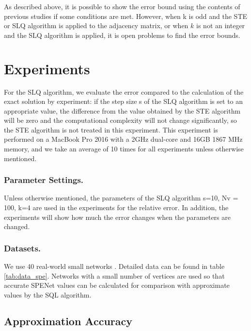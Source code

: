 \documentclass[senior,final,11pt]{iscs-thesis}
\begin{document}
As described above, it is possible to show the error bound using the contents of previous studies if some conditions are met. However, when k is odd and the STE or SLQ algorithm is applied to the adjacency matrix, or when $k$ is not an integer and the SLQ algorithm is applied, it is open problems to find the error bounds.

\section{Experiments}
For the SLQ algorithm, we evaluate the error compared to the calculation of the exact solution by experiment: if the step size s of the SLQ algorithm is set to an appropriate value, the difference from the value obtained by the STE algorithm will be zero and the computational complexity will not change significantly, so the STE algorithm is not treated in this experiment. This experiment is performed on a MacBook Pro 2016 with a 2GHz dual-core and 16GB 1867 MHz memory, and we take an average of 10 times for all experiments unless otherwise mentioned.

\subsubsection*{Parameter Settings.}
Unless otherwise mentioned, the parameters of the SLQ algorithm s=10, Nv = 100, k=4 are used in the experiments for the relative error. In addition, the experiments will show how much the error changes when the parameters are changed.

\subsubsection*{Datasets.}
We use 40 real-world small networks \cite{nr}. Detailed data can be found in table \ref{tab:data_spe}. Networks with a small number of vertices are used so that accurate SPENet values can be calculated for comparison with approximate values by the SQL algorithm.

\subsection{Approximation Accuracy}
\end{document}
